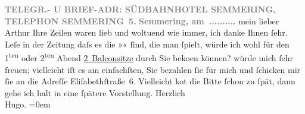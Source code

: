 \begin{ledgroupsized}[t]{13cm}
           \pstart
           \centering{}\textcolor{gray}{\textbf{TELEGR.- U BRIEF-ADR: SÜDBAHNHOTEL SEMMERING, TELEPHON SEMMERING 5.}}\pend
           \pstart
           \noindent{}\raggedleft{}\textcolor{gray}{\textbf{Semmering, am ..........}}\pend
           \pstart{}mein lieber Arthur \pend\pstart
           Ihre Zeilen waren lieb und woltuend wie immer, ich danke Ihnen ſehr.\pend
           \pstart
           Leſe in der Zeitung daſs es die »\label{K_L02053_1v}\label{K_L02053_1h}« ſind, die man ſpielt, würde ich wohl für
               den 1\textsuperscript{ten}{ }{\pb}oder 2\textsuperscript{ten} Abend \uline{2 Balconsitze} durch Sie beko{\geminationm}en können? würde mich ſehr freuen; vielleicht iſt es am
               einfachſten, Sie bezahlen ſie für mich und ſchicken mir ſie an die Adreſſe Eliſabethſtraße 6.\pend
           \pstart
           Vielleicht ko{\geminationm}t die Bitte ſchon zu ſpät, dann gehe ich
               halt in eine ſpätere Vorstellung.\pend
           \pstart
           Herzlich{\\[\baselineskip]}\spacefill\mbox{Hugo.}\pend
           \leftskip=0em{}
         
         \endnumbering{}\end{ledgroupsized}  \newcommand{\dateiname}{L02053}\newcommand{\titel}{Hugo von Hofmannsthal an Arthur Schnitzler, [7. 2. 1912]}\newcommand{\editorInnen}{Martin Anton Müller und Gerd-Hermann Susen}
      